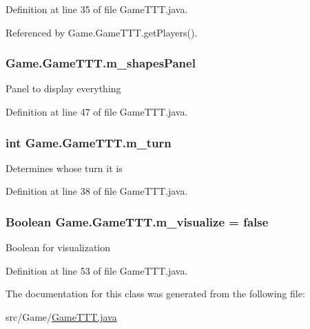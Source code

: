 Definition at line 35 of file Game\+T\+T\+T.\+java.



Referenced by Game.\+Game\+T\+T\+T.\+get\+Players().

\hypertarget{class_game_1_1_game_t_t_t_a6b2de64f05009047dd3a01867da865c0}{}
\subsubsection[{m\+\_\+shapes\+Panel}]{ Game.\+Game\+T\+T\+T.\+m\+\_\+shapes\+Panel\hspace{0.3cm}{\ttfamily [private]}}\label{class_game_1_1_game_t_t_t_a6b2de64f05009047dd3a01867da865c0}
Panel to display everything 

Definition at line 47 of file Game\+T\+T\+T.\+java.

\hypertarget{class_game_1_1_game_t_t_t_a2a4f4d1d24717d2629a2560421e926bc}{}
\subsubsection[{m\+\_\+turn}]{\setlength{\rightskip}{0pt plus 5cm}int Game.\+Game\+T\+T\+T.\+m\+\_\+turn\hspace{0.3cm}{\ttfamily [private]}}\label{class_game_1_1_game_t_t_t_a2a4f4d1d24717d2629a2560421e926bc}
Determines whose turn it is 

Definition at line 38 of file Game\+T\+T\+T.\+java.

\hypertarget{class_game_1_1_game_t_t_t_ad1efe890e60af4826d664276e1e49ea4}{}
\subsubsection[{m\+\_\+visualize}]{\setlength{\rightskip}{0pt plus 5cm}Boolean Game.\+Game\+T\+T\+T.\+m\+\_\+visualize = false\hspace{0.3cm}{\ttfamily [private]}}\label{class_game_1_1_game_t_t_t_ad1efe890e60af4826d664276e1e49ea4}
Boolean for visualization 

Definition at line 53 of file Game\+T\+T\+T.\+java.



The documentation for this class was generated from the following file\+:\begin{DoxyCompactItemize}
\item 
src/\+Game/\hyperlink{_game_t_t_t_8java}{Game\+T\+T\+T.\+java}\end{DoxyCompactItemize}
